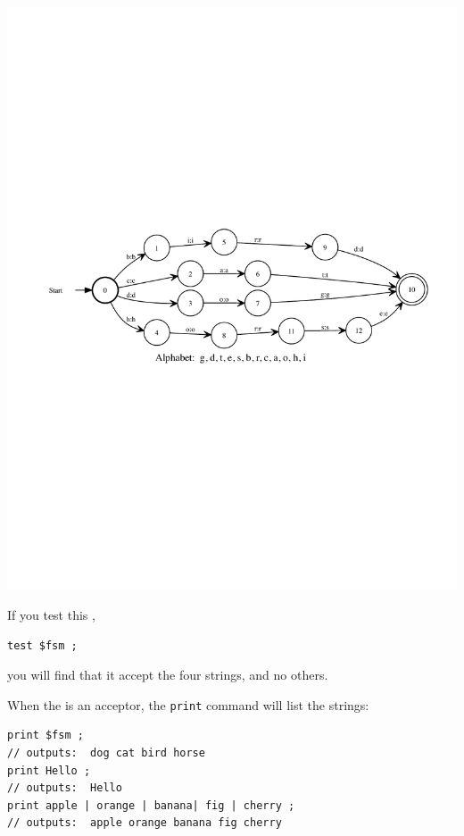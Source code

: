 \begin{center}
\includegraphics[width=135mm]{images/dogcatbirdhorse.pdf}
\end{center}

\noindent
If you test this \fsm{}, 

\begin{Verbatim}
test $fsm ;
\end{Verbatim}

\noindent
you will find that it accept the four strings, and no others.

When the \fsm{} is an acceptor, the \texttt{print} command will list the strings:

\begin{Verbatim}
print $fsm ;
// outputs:  dog cat bird horse
print Hello ;
// outputs:  Hello
print apple | orange | banana| fig | cherry ;
// outputs:  apple orange banana fig cherry
\end{Verbatim}

